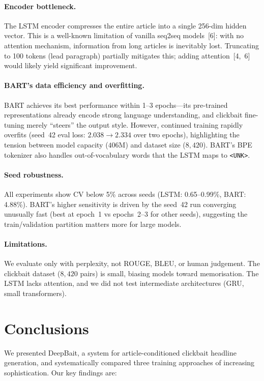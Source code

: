 \documentclass{article}
\begin{document}
\paragraph{Encoder bottleneck.}
The LSTM encoder compresses the entire article into a single 256-dim hidden vector.
This is a well-known limitation of vanilla seq2seq models~[6]: with no attention mechanism, information from long articles is inevitably lost.
Truncating to 100 tokens (lead paragraph) partially mitigates this; adding attention~[4,~6] would likely yield significant improvement.

\paragraph{BART's data efficiency and overfitting.}
BART achieves its best performance within 1--3 epochs---its pre-trained representations already encode strong language understanding, and clickbait fine-tuning merely ``steers'' the output style.
However, continued training rapidly overfits (seed~42 eval loss: $2.038 \rightarrow 2.334$ over two epochs), highlighting the tension between model capacity ($406$M) and dataset size ($8{,}420$).
BART's BPE tokenizer also handles out-of-vocabulary words that the LSTM maps to \texttt{<UNK>}.

\paragraph{Seed robustness.}
All experiments show CV below 5\% across seeds (LSTM: 0.65--0.99\%, BART: 4.88\%).
BART's higher sensitivity is driven by the seed~42 run converging unusually fast (best at epoch~1 vs epochs~2--3 for other seeds), suggesting the train/validation partition matters more for large models.

\paragraph{Limitations.}
We evaluate only with perplexity, not ROUGE, BLEU, or human judgement.
The clickbait dataset ($8{,}420$ pairs) is small, biasing models toward memorisation.
The LSTM lacks attention, and we did not test intermediate architectures (GRU, small transformers).


\section{Conclusions}

We presented DeepBait, a system for article-conditioned clickbait headline generation, and systematically compared three training approaches of increasing sophistication.
Our key findings are:
\end{document}
